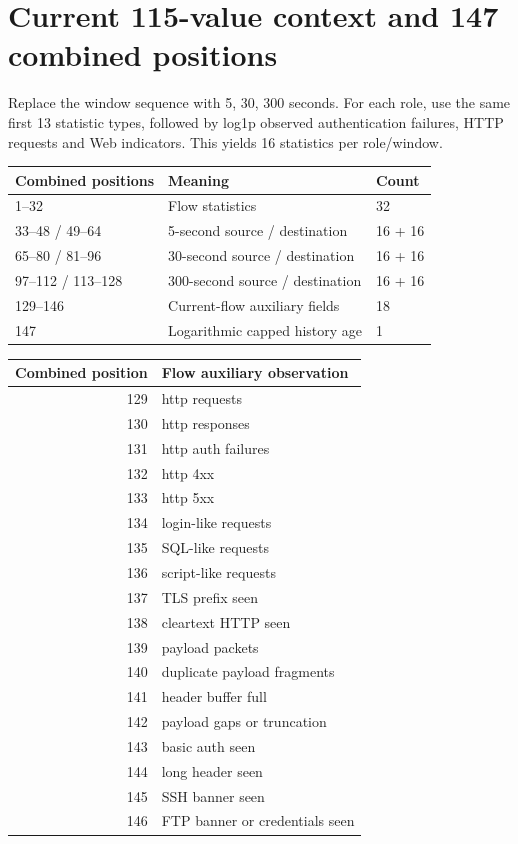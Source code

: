 \documentclass[11pt,a4paper,oneside]{report}
\begin{document}
\section{Current 115-value context and 147 combined positions}
Replace the window sequence with 5, 30, 300 seconds. For each role, use the same first 13 statistic types, followed by log1p observed authentication failures, HTTP requests and Web indicators. This yields 16 statistics per role/window.
\begin{center}\begin{tabular}{lll}\toprule Combined positions & Meaning & Count\\\midrule
1--32 & Flow statistics & 32\\
33--48 / 49--64 & 5-second source / destination & 16 + 16\\
65--80 / 81--96 & 30-second source / destination & 16 + 16\\
97--112 / 113--128 & 300-second source / destination & 16 + 16\\
129--146 & Current-flow auxiliary fields & 18\\
147 & Logarithmic capped history age & 1\\\bottomrule\end{tabular}\end{center}


{\small
\begin{longtable}{@{}rp{}@{}}
\toprule
Combined position & Flow auxiliary observation\\\midrule\endhead
129 & http requests\\
130 & http responses\\
131 & http auth failures\\
132 & http 4xx\\
133 & http 5xx\\
134 & login-like requests\\
135 & SQL-like requests\\
136 & script-like requests\\
137 & TLS prefix seen\\
138 & cleartext HTTP seen\\
139 & payload packets\\
140 & duplicate payload fragments\\
141 & header buffer full\\
142 & payload gaps or truncation\\
143 & basic auth seen\\
144 & long header seen\\
145 & SSH banner seen\\
146 & FTP banner or credentials seen\\
\bottomrule\end{longtable}
}
\end{document}

